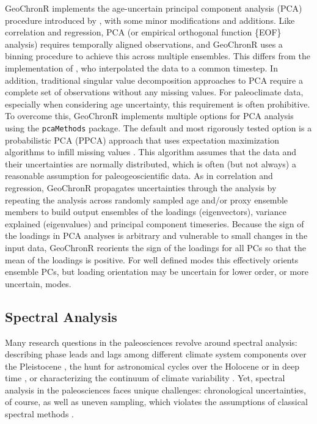 \documentclass[gc, manuscript]{copernicus}
\begin{document}
GeoChronR implements the age-uncertain principal component analysis (PCA) procedure introduced by \citet{anchukaitis2013mceof}, with some minor modifications and additions.
Like correlation and regression, PCA (or empirical orthogonal function \{EOF\} analysis) requires temporally aligned observations, and GeoChronR uses a binning procedure to achieve this across multiple ensembles.
This differs from the implementation of \citet{anchukaitis2013mceof}, who interpolated the data to a common timestep.
In addition, traditional singular value decomposition approaches to PCA require a complete set of observations without any missing values.
For paleoclimate data, especially when considering age uncertainty, this requirement is often prohibitive.
To overcome this, GeoChronR implements multiple options for PCA analysis using the \texttt{pcaMethods} package.
The default and most rigorously tested option is a probabilistic PCA (PPCA) approach that uses expectation maximization algorithms to infill missing values \citep{roweis1998algorithms}.
This algorithm assumes that the data and their uncertainties are normally distributed, which is often (but not always) a reasonable assumption for paleogeoscientific data.
As in correlation and regression, GeoChronR propagates uncertainties through the analysis by repeating the analysis across randomly sampled age and/or proxy ensemble members to build output ensembles of the loadings (eigenvectors), variance explained (eigenvalues) and principal component timeseries.
Because the sign of the loadings in PCA analyses is arbitrary and vulnerable to small changes in the input data, GeoChronR reorients the sign of the loadings for all PCs so that the mean of the loadings is positive.
For well defined modes this effectively orients ensemble PCs, but loading orientation may be uncertain for lower order, or more uncertain, modes.

\hypertarget{sec:spec_theory}{%
\subsection{Spectral Analysis}\label{sec:spec_theory}}

Many research questions in the paleosciences revolve around spectral analysis: describing phase leads and lags among different climate system components over the Pleistocene \citep[SPECMAP,][]{imbrie1984orbital}, the hunt for astronomical cycles over the Holocene \citep[\citet{bond2001}]{mill_monograph} or in deep time \citep[\citet{Meyers_2012},\citet{Meyers_2015}]{MeyersSageman_2007}, or characterizing the continuum of climate variability \citep[\citet{ZhuPNAS2019}]{Huybers_Curry2006}.
Yet, spectral analysis in the paleosciences faces unique challenges: chronological uncertainties, of course, as well as uneven sampling, which violates the assumptions of classical spectral methods \citep{Ghil02}.
\end{document}
